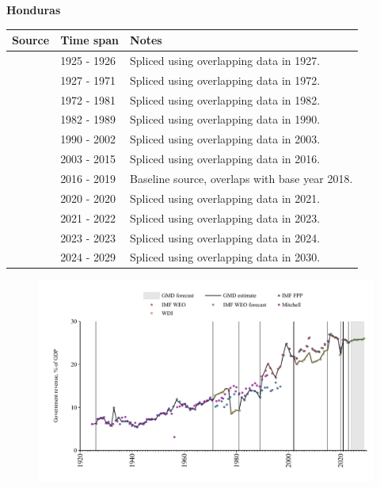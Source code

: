 \documentclass[12pt,a4paper,landscape]{article}
\begin{document}
\begin{adjustbox}{max totalsize={\paperwidth}{\paperheight},center}
\begin{minipage}[t][\textheight][t]{\textwidth}
\vspace*{0.5cm}
{}
\begin{center}
{\Large\bfseries Honduras}
\end{center}
\vspace{0.5cm}
\begin{table}[H]
\centering
\small
\begin{tabular}{|l|l|l|}
\hline
\textbf{Source} & \textbf{Time span} & \textbf{Notes} \\
\hline
\rowcolor{white}\cite{Mitchell}& 1925 - 1926 &Spliced using overlapping data in 1927.\\
\rowcolor{lightgray}\cite{IMF_FPP}& 1927 - 1971 &Spliced using overlapping data in 1972.\\
\rowcolor{white}\cite{WDI}& 1972 - 1981 &Spliced using overlapping data in 1982.\\
\rowcolor{lightgray}\cite{IMF_FPP}& 1982 - 1989 &Spliced using overlapping data in 1990.\\
\rowcolor{white}\cite{IMF_WEO}& 1990 - 2002 &Spliced using overlapping data in 2003.\\
\rowcolor{lightgray}\cite{WDI}& 2003 - 2015 &Spliced using overlapping data in 2016.\\
\rowcolor{white}\cite{IMF_WEO}& 2016 - 2019 &Baseline source, overlaps with base year 2018.\\
\rowcolor{lightgray}\cite{WDI}& 2020 - 2020 &Spliced using overlapping data in 2021.\\
\rowcolor{white}\cite{IMF_WEO}& 2021 - 2022 &Spliced using overlapping data in 2023.\\
\rowcolor{lightgray}\cite{IMF_FPP}& 2023 - 2023 &Spliced using overlapping data in 2024.\\
\rowcolor{white}\cite{IMF_WEO_forecast}& 2024 - 2029 &Spliced using overlapping data in 2030.\\
\hline
\end{tabular}
\end{table}
\begin{figure}[H]
\centering
\includegraphics[width=\textwidth,height=0.6\textheight,keepaspectratio]{graphs/HND_govrev_GDP.pdf}
\end{figure}
\end{minipage}
\end{adjustbox}
\end{document}
